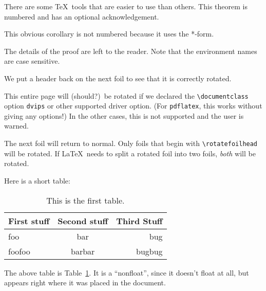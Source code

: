 \documentclass{beamer}
\begin{document}

\begin{Theorem}[TUG'92]
There are some \TeX\ tools that are easier to use than others.  This
theorem is numbered and has an optional acknowledgement.
\end{Theorem}

\begin{Corollary*}
This obvious corollary is not numbered because it uses the *-form.
\end{Corollary*}

\begin{Proof}
The details of the proof are left to the reader.  Note that the
environment names are case sensitive.
\end{Proof}

We put a header back on the next foil to see that it is correctly
rotated.


This entire page will (should?)~be rotated if we declared the
\verb|\documentclass| option \texttt{dvips} or other supported driver
option.  (For \texttt{pdflatex}, this works without giving any
options!)  In the other cases, this is not supported and the user is
warned.

The next foil will return to normal.  Only foils that begin with
\verb|\rotatefoilhead| will be rotated.  If \LaTeX\ needs to split a
rotated foil into two foils, \emph{both} will be rotated.

\leftheader{}

Here is a short table:

\begin{table}
\begin{center}
\begin{tabular}{|l|c|r|} \hline
First stuff & Second stuff & Third Stuff \\ \hline\hline
foo & bar & bug \\ \hline
foofoo & barbar & bugbug \\ \hline
\end{tabular}
\caption{\label{tab:one}This is the first table.}
\end{center}
\end{table}

The above table is Table~\ref{tab:one}.  It is a ``nonfloat'', since
it doesn't float at all, but appears right where it was placed in the
document.
\end{document}
